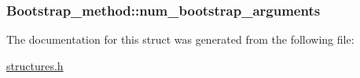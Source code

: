 \subsubsection[{\texorpdfstring{num\+\_\+bootstrap\+\_\+arguments}{num_bootstrap_arguments}}]{ Bootstrap\+\_\+method\+::num\+\_\+bootstrap\+\_\+arguments}\hypertarget{structBootstrap__method_a492a9b7d938c1c6d98b7100530c3dfc1}{}\label{structBootstrap__method_a492a9b7d938c1c6d98b7100530c3dfc1}


The documentation for this struct was generated from the following file\+:\begin{DoxyCompactItemize}
\item 
\hyperlink{structures_8h}{structures.\+h}\end{DoxyCompactItemize}
